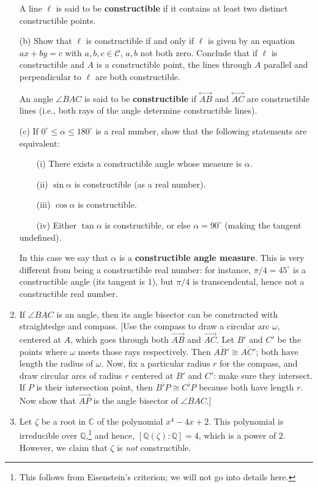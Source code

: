\documentclass[leqno]{book}
\begin{document}
\begin{enumerate}
A line $\ell$ is said to be \textbf{constructible} if it contains at least two distinct constructible points.

(b) Show that $\ell$ is constructible if and only if $\ell$ is given by an equation $ax+by=c$ with $a,b,c\in\mathscr C$, $a,b$ not both zero.  Conclude that if $\ell$ is constructible and $A$ is a constructible point, the lines through $A$ parallel and perpendicular to $\ell$ are both constructible.

An angle $\angle BAC$ is said to be \textbf{constructible} if $\overset{\longleftrightarrow}{AB}$ and $\overset{\longleftrightarrow}{AC}$ are constructible lines (i.e., both rays of the angle determine constructible lines).

(c) If $0^\circ\leqslant\alpha\leqslant 180^\circ$ is a real number, show that the following statements are equivalent:

~~~~(i) There exists a constructible angle whose measure is $\alpha$.

~~~~(ii) $\sin\alpha$ is constructible (as a real number).

~~~~(iii) $\cos\alpha$ is constructible.

~~~~(iv) Either $\tan\alpha$ is constructible, or else $\alpha=90^\circ$ (making the tangent undefined).

In this case we say that $\alpha$ is a \textbf{constructible angle measure}.  This is very different from being a constructible real number: for instance, $\pi/4=45^\circ$ is a constructible angle (its tangent is $1$), but $\pi/4$ is transcendental, hence not a constructible real number.

\item If $\angle BAC$ is an angle, then its angle bisector can be constructed with straightedge and compass.  [Use the compass to draw a circular arc $\omega$, centered at $A$, which goes through both $\overset{\longrightarrow}{AB}$ and $\overset{\longrightarrow}{AC}$.  Let $B'$ and $C'$ be the points where $\omega$ meets those rays respectively.  Then $\overline{AB'}\cong\overline{AC'}$; both have length the radius of $\omega$.  Now, fix a particular radius $r$ for the compass, and draw circular arcs of radius $r$ centered at $B'$ and $C'$: make sure they intersect.  If $P$ is their intersection point, then $\overline{B'P}\cong\overline{C'P}$ because both have length $r$.  Now show that $\overset{\longrightarrow}{AP}$ is the angle bisector of $\angle BAC$.]

\item Let $\zeta$ be a root in $\mathbb C$ of the polynomial $x^4-4x+2$.  This polynomial is irreducible over $\mathbb Q$,\footnote{This follows from Eisenstein's criterion; we will not go into details here.} and hence, $[\mathbb Q(\zeta):\mathbb Q]=4$, which is a power of $2$.  However, we claim that $\zeta$ is \emph{not} constructible.


\end{enumerate}
\end{document}
